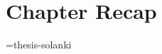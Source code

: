 \documentclass[thesis-solanki.tex]{subfiles}
\begin{document}

\section{Chapter Recap}

\if\jobname={thesis-solanki}\else
\begin{scope}
  \nolinenumbers
  \enotesize
  \par
  \begin{singlespace}
  \setlength{\parskip}{12pt plus 2pt minus 1pt}
  \theendnotes
  \par
  \end{singlespace}
\end{scope}
\fi
\end{document}
